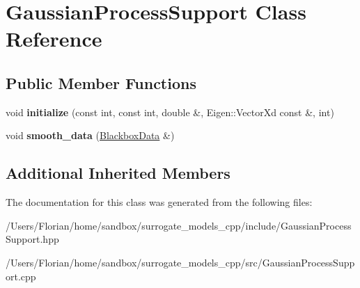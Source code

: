 \hypertarget{class_gaussian_process_support}{}\section{Gaussian\+Process\+Support Class Reference}
\label{class_gaussian_process_support}
\subsection*{Public Member Functions}
\begin{DoxyCompactItemize}
\item 
void {\bfseries initialize} (const int, const int, double \&, Eigen\+::\+Vector\+Xd const \&, int)\hypertarget{class_gaussian_process_support_ae720cd38aab69e6c0a5b9b35d771bcbd}{}\label{class_gaussian_process_support_ae720cd38aab69e6c0a5b9b35d771bcbd}

\item 
void {\bfseries smooth\+\_\+data} (\hyperlink{struct_blackbox_data}{Blackbox\+Data} \&)\hypertarget{class_gaussian_process_support_a2a7c9959b86b676269c5654ed7873e59}{}\label{class_gaussian_process_support_a2a7c9959b86b676269c5654ed7873e59}

\end{DoxyCompactItemize}
\subsection*{Additional Inherited Members}


The documentation for this class was generated from the following files\+:\begin{DoxyCompactItemize}
\item 
/\+Users/\+Florian/home/sandbox/surrogate\+\_\+models\+\_\+cpp/include/Gaussian\+Process\+Support.\+hpp\item 
/\+Users/\+Florian/home/sandbox/surrogate\+\_\+models\+\_\+cpp/src/Gaussian\+Process\+Support.\+cpp\end{DoxyCompactItemize}
